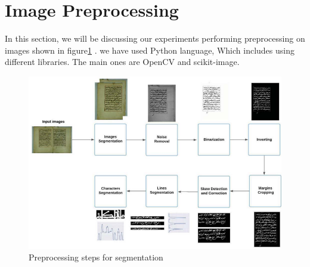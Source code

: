 \newpage

\section{Image Preprocessing}
In this section, we will be discussing our experiments performing preprocessing on images shown in figure\ref{fig:preprocessing} . we have used Python language, Which includes using different libraries. The main ones are OpenCV and scikit-image.

\begin{figure}[!htb]
    \centering
    \includegraphics[width=14cm]{images/preprocessing.png}
    \caption{Preprocessing steps for segmentation}
    \label{fig:preprocessing}
\end{figure}

